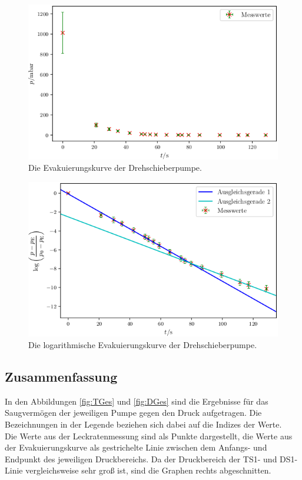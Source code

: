 \begin{figure}
\centering
\includegraphics[width=\linewidth-70pt,height=\textheight-70pt,keepaspectratio]{content/images/DSE.png}
\caption{Die Evakuierungskurve der Drehschieberpumpe.}
\label{fig:DSE}
\end{figure}

\begin{figure}
\centering
\includegraphics[width=\linewidth-70pt,height=\textheight-70pt,keepaspectratio]{content/images/DSL.png}
\caption{Die logarithmische Evakuierungskurve der Drehschieberpumpe.}
\label{fig:DSL}
\end{figure}

\subsection{Zusammenfassung} 

In den Abbildungen \ref{fig:TGes} und \ref{fig:DGes} sind die Ergebnisse für das Saugvermögen der jeweiligen Pumpe gegen den Druck aufgetragen. Die Bezeichnungen in der Legende beziehen sich dabei auf die Indizes der Werte.\\
Die Werte aus der Leckratenmessung sind als Punkte dargestellt, die Werte aus der Evakuierungskurve als gestrichelte Linie zwischen dem Anfangs- und Endpunkt des jeweiligen Druckbereichs. Da der Druckbereich der TS1- und DS1-Linie vergleichsweise sehr groß ist, sind die Graphen rechts abgeschnitten. 


